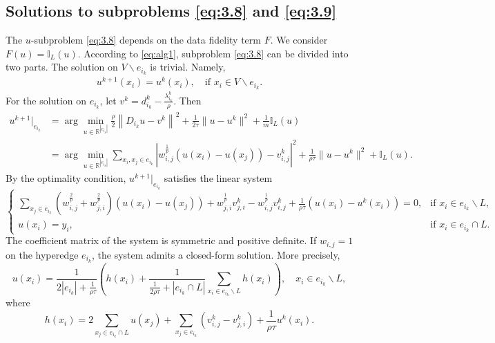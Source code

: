 \documentclass{article}
\theoremstyle{definition}
\begin{document}
\subsection{Solutions to subproblems \eqref{eq:3.8} and \eqref{eq:3.9}}

The $u$-subproblem \eqref{eq:3.8} depends on the data fidelity term $F$.
We consider $F(u)=\mathbb{I}_L(u)$.
According to \eqref{eq:alg1}, subproblem \eqref{eq:3.8} can be divided into two parts. The solution on $V\backslash e_{i_k}$ is trivial.
Namely,
\begin{align*}
  u^{k+1}(x_i)=
    u^{k}(x_i), \quad \mbox{if } x_i\in V\backslash e_{i_k}.
\end{align*}
For the solution on $e_{i_k}$,
let $v^{k}=d_{i_k}^{k}-\frac{\lambda_{i_k}^{k}}{\rho}$. Then
\begin{align*}
  u^{k+1}|_{e_{i_k}}
  &=\arg\min_{u\in\mathbb{R}^{|e_{i_k}|}}\frac{\rho}{2}
  \left\|D_{i_k}u-v^{k}\right\|^2
  +\frac{1}{2\tau} \|u-u^k\|^2+\frac{1}{m}\mathbb{I}_L(u)\\
  &=\arg\min_{u\in\mathbb{R}^{|e_{i_k}|}}
  \sum_{x_i,x_j\in e_{i_k}}\left|w^{\frac{1}{p}}_{i,j}(u(x_i)-u(x_j))-v^{k}_{i,j}\right|^2
  +\frac{1}{\rho\tau} \|u-u^k\|^2+\mathbb{I}_L(u).
\end{align*}
By the optimality condition,
$u^{k+1}|_{e_{i_k}}$ satisfies the linear system
\begin{equation*}
  \begin{cases}
    \sum\limits_{x_j\in e_{i_k}}\left(w_{i,j}^{\frac{2}{p}}+w_{j,i}^{\frac{2}{p}}\right)
    (u(x_i)-u(x_j))
    +w^{\frac{1}{p}}_{j,i}v^{k}_{j,i}-w^{\frac{1}{p}}_{i,j}v^{k}_{i,j}
    +\frac{1}{\rho\tau}(u(x_i)-u^k(x_i))=0,  &\mbox{if } x_i\in e_{i_k}\backslash L, \\
    u(x_i)=y_i, &\mbox{if } x_i\in e_{i_k}\cap L.
  \end{cases}
\end{equation*}
The coefficient matrix of the system is symmetric and positive definite.
If $w_{i,j} = 1$ on the hyperedge $e_{i_k}$, the system admits a closed-form solution.
More precisely,
\[
u(x_i)=\frac{1}{2|e_{i_k}|+\frac{1}{\rho\tau}}\left(h(x_i)
+\frac{1}{\frac{1}{2\rho\tau}+|e_{i_k}\cap L|}
\sum_{x_i\in e_{i_k}\backslash L}h(x_i)\right), \quad x_i\in e_{i_k}\backslash L,
\]
where
\[
h(x_i)=2\sum_{x_j\in e_{i_k}\cap L}u(x_j)
+\sum_{x_j\in e_{i_k}}({v^{k}_{i,j}-v^{k}_{j,i}})
+\frac{1}{\rho\tau}u^k(x_i).
\]
\end{document}
